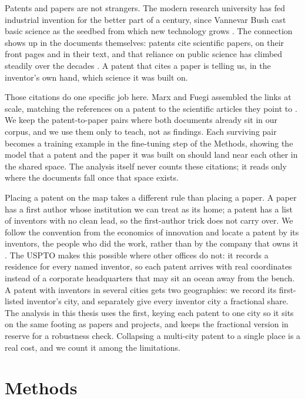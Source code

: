 \documentclass[12pt,a4paper]{article}
\begin{document}
	Patents and papers are not strangers. The modern research university has fed industrial invention for the better part of a century, since Vannevar Bush cast basic science as the seedbed from which new technology grows \parencite{bushScienceEndlessFrontier1945}. The connection shows up in the documents themselves: patents cite scientific papers, on their front pages and in their text, and that reliance on public science has climbed steadily over the decades \parencite{narinIncreasingLinkage1997}. A patent that cites a paper is telling us, in the inventor's own hand, which science it was built on.

Those citations do one specific job here. Marx and Fuegi assembled the links at scale, matching the references on a patent to the scientific articles they point to \parencite{marxFuegiRelianceScience2020}. We keep the patent-to-paper pairs where both documents already sit in our corpus, and we use them only to teach, not as findings. Each surviving pair becomes a training example in the fine-tuning step of the Methods, showing the model that a patent and the paper it was built on should land near each other in the shared space. The analysis itself never counts these citations; it reads only where the documents fall once that space exists.

Placing a patent on the map takes a different rule than placing a paper. A paper has a first author whose institution we can treat as its home; a patent has a list of inventors with no clean lead, so the first-author trick does not carry over. We follow the convention from the economics of innovation and locate a patent by its inventors, the people who did the work, rather than by the company that owns it \parencite{breschiKnowledgeSpilloversLocal2001}. The USPTO makes this possible where other offices do not: it records a residence for every named inventor, so each patent arrives with real coordinates instead of a corporate headquarters that may sit an ocean away from the bench. A patent with inventors in several cities gets two geographies: we record its first-listed inventor's city, and separately give every inventor city a fractional share. The analysis in this thesis uses the first, keying each patent to one city so it sits on the same footing as papers and projects, and keeps the fractional version in reserve for a robustness check. Collapsing a multi-city patent to a single place is a real cost, and we count it among the limitations.
	
	\section{Methods}
	
\end{document}
